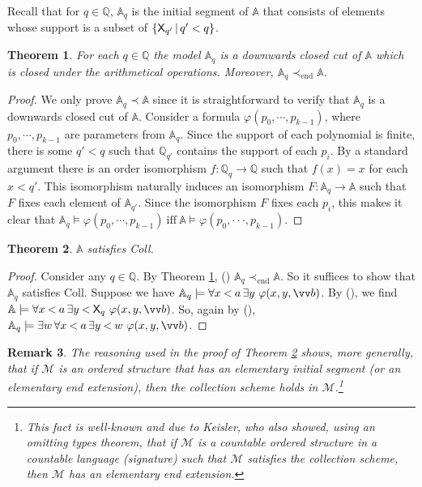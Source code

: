 \documentclass{amsart}
\renewcommand{\phi}{\varphi}
\newtheorem{theorem}{Theorem}[section]
\newtheorem{rem}[theorem]{Remark}
\newcommand{\bles}{\mathbin{<}}
\newcommand{\X}{{\sf X}}
\begin{document}
Recall that for $q\in \mathbb{Q}$, $\mathbb A_q$ is the initial segment of $\mathbb{A}$ that consists of elements whose support is a subset of  $\{\X_{q'} \mathop\mid q'<q\}$.

\begin{theorem}\label{eee_for_A}
   For each  $q\in \mathbb{Q}$ the model $\mathbb A_q$ is a downwards closed cut of $\mathbb A$ which is closed under the arithmetical
   operations. Moreover, $\mathbb A_q \prec_{\mathrm{end}} \mathbb{A}$.
\end{theorem}

\begin{proof} 
We only prove $\mathbb A_q \prec \mathbb{A}$ 
 since it is straightforward to verify that $\mathbb A_q$ is a downwards closed cut of $\mathbb A$. Consider a formula 
 $\varphi (p_{0},\cdots ,p_{k-1})$, where $p_{0},\cdots ,p_{k-1}$ are parameters from $\mathbb{A}_q.$ Since the support of each 
 polynomial is finite, there is some $q'<q$ such that $\mathbb{Q}_{q'}$ contains the support of each $p_i$. By  a standard argument there is an order 
isomorphism $f:\mathbb{Q}_{q}\rightarrow \mathbb{Q}$ such that $f(x)=x$ for each $x<q'$. This isomorphism naturally induces an
isomorphism $F:\mathbb{A}_q \rightarrow 
\mathbb{A}$ such that $F$ fixes each element of $\mathbb{A}_{q'}$. 
Since the isomorphism $F$ fixes each $p_i$, this makes it clear that 
$\mathbb{A}_{q}\models \varphi (p_{0},\cdots ,p_{k-1})~\mathrm{iff~}
\mathbb{A}\models \varphi (p_{0},\cdot \cdot \cdot,p_{k-1})$. 
\end{proof}

\begin{theorem} \label{coll_in_A}
    $\mathbb A$ satisfies {\sf Coll}.
\end{theorem}

\begin{proof} 
Consider any $q \in \mathbb Q$. By Theorem \ref{eee_for_A}, (\dag) $\mathbb{A}_{q}\prec_{\mathrm{end}} \mathbb{A}$.
So it suffices to show that $\mathbb{A}_{q}$ satisfies {\sf Coll}.
Suppose we have $\mathbb{A}_q\models\forall x \bles a \,\exists y~\phi(x,y,\vv b)$. By (\dag), we find
$\mathbb{A}\models\forall x \bles a \,\exists y\bles \X_q ~\phi(x,y,\vv b)$. So, again by (\dag),
$\mathbb{A}_q\models\exists w\, \forall x \bles a \,\exists y\bles w~\phi(x,y,\vv b)$.
 \end{proof}

\begin{rem} \label{eee_and_coll} The reasoning used in the proof of Theorem \ref{coll_in_A} shows, more generally, that 
if $\mathcal{M}$ is an ordered structure that has an elementary initial segment \textup(or an elementary end extension\textup), 
then the collection scheme holds in $\mathcal{M}$.\footnote{This fact is well-known and due to Keisler, 
who also showed, using an omitting types theorem, that if $\mathcal{M}$ is a countable ordered structure 
in a countable language (signature) such that $\mathcal{M}$ satisfies the collection scheme, 
then $\mathcal{M}$ has an elementary end extension.} 
\end{rem}
    
\end{document}
